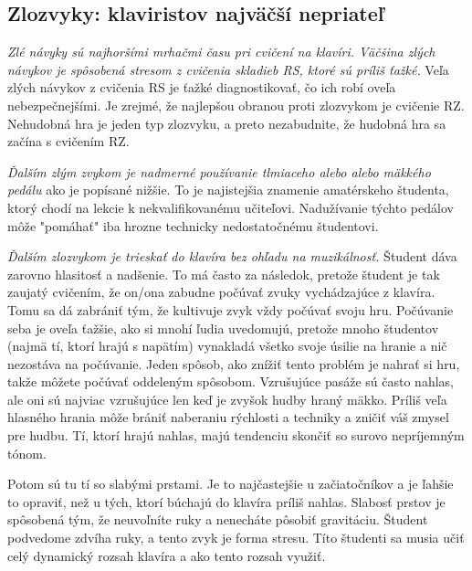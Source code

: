 \subsection{Zlozvyky: klaviristov najväčší nepriateľ}
\emph{Zlé návyky sú najhoršími mrhačmi času pri cvičení na klavíri. Väčšina zlých návykov je spôsobená stresom z cvičenia skladieb RS, ktoré sú príliš ťažké.} Veľa zlých návykov z cvičenia RS je ťažké diagnostikovať, čo ich robí oveľa nebezpečnejšími. Je zrejmé, že najlepšou obranou proti zlozvykom je cvičenie RZ. Nehudobná hra je jeden typ zlozvyku, a preto nezabudnite, že hudobná hra sa začína s cvičením RZ.

\emph{Ďalším zlým zvykom je nadmerné používanie tlmiaceho alebo alebo mäkkého pedálu} ako je popísané nižšie. To je najistejšia znamenie amatérskeho študenta, ktorý chodí na lekcie k nekvalifikovanému učiteľovi. Nadužívanie týchto pedálov môže "pomáhať" iba hrozne technicky nedostatočnému študentovi.

\emph{Ďalším zlozvykom je trieskať do klavíra bez ohľadu na muzikálnosť.} Študent dáva zarovno hlasitosť a nadšenie. To má často za následok, pretože študent je tak zaujatý cvičením, že on/ona zabudne počúvať zvuky vychádzajúce z klavíra. Tomu sa dá zabrániť tým, že kultivuje zvyk vždy počúvať svoju hru. Počúvanie seba je oveľa ťažšie, ako si mnohí ľudia uvedomujú, pretože mnoho študentov (najmä tí, ktorí hrajú s napätím) vynakladá všetko svoje úsilie na hranie a nič nezostáva na počúvanie. Jeden spôsob, ako znížiť tento problém je nahrať si hru, takže môžete počúvať oddeleným spôsobom. Vzrušujúce pasáže sú často nahlas, ale oni sú najviac vzrušujúce len keď je zvyšok hudby hraný mäkko. Príliš veľa hlasného hrania  môže brániť naberaniu rýchlosti a techniky a zničiť váš zmysel pre hudbu. Tí, ktorí hrajú nahlas, majú tendenciu skončiť so surovo nepríjemným tónom.

Potom sú tu tí so slabými prstami. Je to najčastejšie u začiatočníkov a je ľahšie to opraviť, než u tých, ktorí búchajú do klavíra príliš nahlas. Slabosť prstov je spôsobená tým, že
neuvoľníte ruky a nenecháte pôsobiť gravitáciu. Študent podvedome zdvíha ruky, a tento zvyk je forma stresu. Títo študenti sa musia učiť celý dynamický rozsah klavíra a ako tento rozsah využiť.

